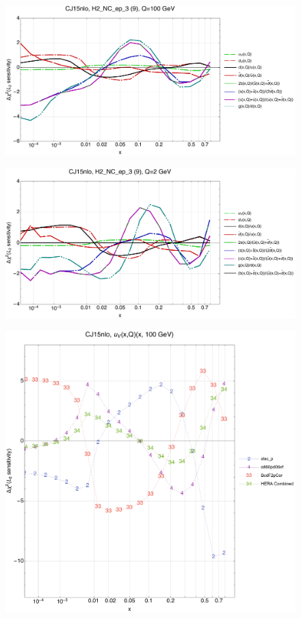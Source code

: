 \documentclass[10pt,aps,prd,floatfix,titlepage]{revtex4}
\begin{document}
\clearpage
\begin{figure}
\includegraphics[width=\textwidth,height=0.44\textheight,keepaspectratio]{2/9_CJ15nlo_q100_Sf_2.pdf}
\caption{}
\end{figure}
\begin{figure}
\includegraphics[width=\textwidth,height=0.44\textheight,keepaspectratio]{2/9_CJ15nlo_q2_Sf_2.pdf}
\caption{}
\end{figure}
\clearpage
\begin{figure}
\includegraphics[width=\textwidth,height=0.44\textheight,keepaspectratio]{2/rat_ifl1_CJ15nlo_L2_q100_Sf_2.pdf}
\caption{}
\end{figure}
\end{document}

